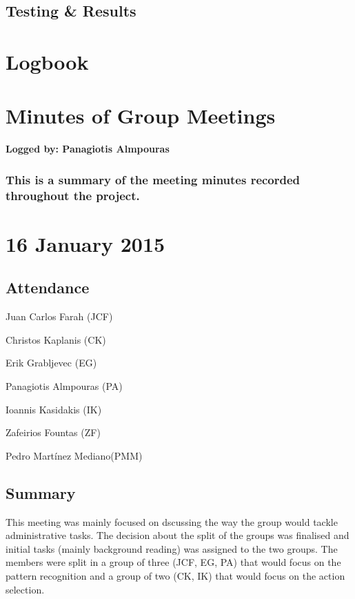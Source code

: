 \documentclass[a4paper,11pt]{article}
\begin{document}
\subsection{Testing \& Results}





\clearpage

{}

\clearpage
\appendix
\section{Logbook}

\clearpage
\section{Minutes of Group Meetings}
\textbf{Logged by: Panagiotis Almpouras}
\subsubsection*{This is a summary of the meeting minutes recorded throughout the project.}
\maketitle
\section*{16 January 2015}
\subsection*{Attendance}
\begin{compactenum}
\item Juan Carlos Farah (JCF)
\item Christos Kaplanis (CK)
\item Erik Grabljevec (EG)
\item Panagiotis Almpouras (PA)
\item Ioannis Kasidakis (IK)
\item Zafeirios Fountas (ZF)
\item Pedro Martínez Mediano(PMM)
\end{compactenum}

\subsection*{Summary}
This meeting was mainly focused on dscussing the way the group would tackle administrative tasks. The decision about the split of the groups was finalised and initial tasks (mainly background reading) was assigned to the two groups. The members were split in a group of three (JCF, EG, PA) that would focus on the pattern recognition and a group of two (CK, IK) that would focus on the action selection.
\end{document}
